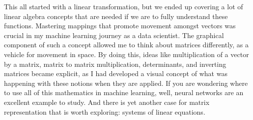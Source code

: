 \documentclass[600paper, 11pt,twoside,openany]{kdp}
\begin{document}
\indent This all started with a linear transformation, but we ended up covering a lot of linear algebra concepts that are needed if we are to fully understand these functions. Mastering mappings that promote movement amongst vectors was crucial in my machine learning journey as a data scientist. The graphical component of such a concept allowed me to think about matrices differently, as a vehicle for movement in space. By doing this, ideas like multiplication of a vector by a matrix, matrix to matrix multiplication, determinants, and inverting matrices became explicit, as I had developed a visual concept of what was happening with these notions when they are applied. If you are wondering where to use all of this mathematics in machine learning, well, neural networks are an excellent example to study. And there is yet another case for matrix representation that is worth exploring: systems of linear equations.
\end{document}
